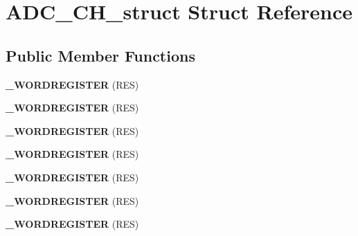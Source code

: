 \hypertarget{struct_a_d_c___c_h__struct}{}\section{A\+D\+C\+\_\+\+C\+H\+\_\+struct Struct Reference}
\label{struct_a_d_c___c_h__struct}
\subsection*{Public Member Functions}
\begin{DoxyCompactItemize}
\item 
{\bfseries \+\_\+\+W\+O\+R\+D\+R\+E\+G\+I\+S\+T\+ER} (R\+ES)\hypertarget{struct_a_d_c___c_h__struct_ab8b10a262a98933419b594bdfe6ecc7a}{}\label{struct_a_d_c___c_h__struct_ab8b10a262a98933419b594bdfe6ecc7a}

\item 
{\bfseries \+\_\+\+W\+O\+R\+D\+R\+E\+G\+I\+S\+T\+ER} (R\+ES)\hypertarget{struct_a_d_c___c_h__struct_ab8b10a262a98933419b594bdfe6ecc7a}{}\label{struct_a_d_c___c_h__struct_ab8b10a262a98933419b594bdfe6ecc7a}

\item 
{\bfseries \+\_\+\+W\+O\+R\+D\+R\+E\+G\+I\+S\+T\+ER} (R\+ES)\hypertarget{struct_a_d_c___c_h__struct_ab8b10a262a98933419b594bdfe6ecc7a}{}\label{struct_a_d_c___c_h__struct_ab8b10a262a98933419b594bdfe6ecc7a}

\item 
{\bfseries \+\_\+\+W\+O\+R\+D\+R\+E\+G\+I\+S\+T\+ER} (R\+ES)\hypertarget{struct_a_d_c___c_h__struct_ab8b10a262a98933419b594bdfe6ecc7a}{}\label{struct_a_d_c___c_h__struct_ab8b10a262a98933419b594bdfe6ecc7a}

\item 
{\bfseries \+\_\+\+W\+O\+R\+D\+R\+E\+G\+I\+S\+T\+ER} (R\+ES)\hypertarget{struct_a_d_c___c_h__struct_ab8b10a262a98933419b594bdfe6ecc7a}{}\label{struct_a_d_c___c_h__struct_ab8b10a262a98933419b594bdfe6ecc7a}

\item 
{\bfseries \+\_\+\+W\+O\+R\+D\+R\+E\+G\+I\+S\+T\+ER} (R\+ES)\hypertarget{struct_a_d_c___c_h__struct_ab8b10a262a98933419b594bdfe6ecc7a}{}\label{struct_a_d_c___c_h__struct_ab8b10a262a98933419b594bdfe6ecc7a}

\item 
{\bfseries \+\_\+\+W\+O\+R\+D\+R\+E\+G\+I\+S\+T\+ER} (R\+ES)\hypertarget{struct_a_d_c___c_h__struct_ab8b10a262a98933419b594bdfe6ecc7a}{}\label{struct_a_d_c___c_h__struct_ab8b10a262a98933419b594bdfe6ecc7a}


\end{DoxyCompactItemize}
